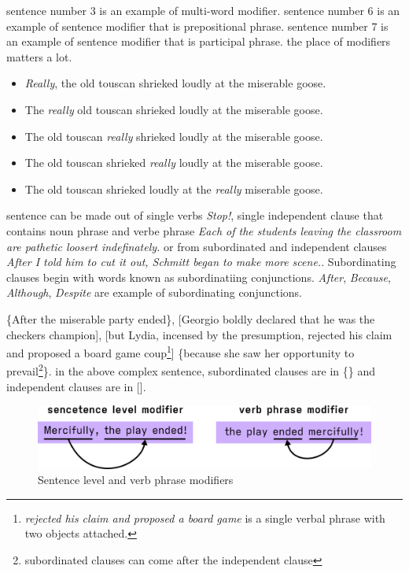 \documentclass[a4paper]{article}
\begin{document}
sentence number 3 is an example of multi-word modifier. sentence number 6 is an example of sentence modifier that is prepositional
phrase. sentence number 7 is an example of sentence modifier that is participal phrase. the place of modifiers matters a lot.

\begin{itemize}
    \item \emph{Really}, the old touscan shrieked loudly at the miserable goose.
    \item The \emph{really} old touscan shrieked loudly at the miserable goose.
    \item The old touscan \emph{really} shrieked loudly at the miserable goose.
    \item The old touscan shrieked \emph{really} loudly at the miserable goose.
    \item The old touscan shrieked loudly at the \emph{really} miserable goose.
\end{itemize}

sentence can be made out of single verbs \emph{Stop!}, single independent clause that contains noun phrase and verbe phrase 
\emph{Each of the students leaving the classroom are pathetic loosert indefinately.} or from subordinated and independent clauses
\emph{After I told him to cut it out, Schmitt began to make more scene.}. Subordinating clauses begin with words known as 
subordinatiing conjunctions. \emph{After}, \emph{Because}, \emph{Although}, \emph{Despite} are example of subordinating conjunctions.

\{After the miserable party ended\}, [Georgio boldly declared that he was the  checkers champion], [but Lydia,
        incensed by the presumption, rejected his claim and proposed a board game coup\footnote{
            \emph{rejected his claim and proposed a board game} is a single verbal phrase with two objects attached.}]
\{because she saw her opportunity to prevail\footnote{subordinated clauses can come after the independent clause}\}. in the 
above complex sentence, subordinated clauses are in \{\} and independent clauses are in [].


\begin{figure}[hbt!]
    \includegraphics[width=\textwidth]{graphics/sentence-modifier.png}
    \caption{Sentence level and verb phrase modifiers}
\end{figure}
\end{document}
